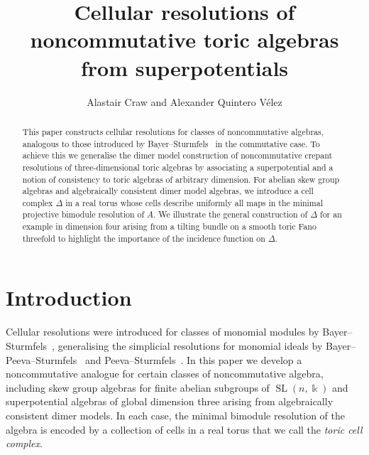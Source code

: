 \documentclass[11pt,a4paper]{amsart}
\title{Cellular resolutions of noncommutative toric algebras from superpotentials}
\author{Alastair Craw and Alexander Quintero V\'{e}lez}
\numberwithin{equation}{section}
\theoremstyle{definition}
\theoremstyle{remark}
\newcommand{\kk}{\ensuremath{\Bbbk}}
\newcommand{\SL}{\operatorname{SL}}
\begin{document}


 \begin{abstract}
  This paper constructs cellular resolutions for classes of noncommutative algebras,  analogous to those introduced by Bayer--Sturmfels~\cite{BayerSturmfels} in the  commutative case. To achieve this we generalise the dimer model construction of noncommutative crepant resolutions of three-dimensional toric algebras by associating a superpotential and a notion of consistency to toric algebras of arbitrary dimension. For abelian skew group algebras and algebraically consistent dimer model algebras, we introduce a cell complex $\Delta$ in a real torus whose cells describe uniformly all maps in the minimal projective bimodule resolution of $A$. We illustrate the general construction of $\Delta$ for an example in dimension four arising from a tilting bundle on a smooth toric Fano threefold to highlight the importance of the incidence function on $\Delta$.
  \end{abstract}

 \maketitle

 \section{Introduction}
 Cellular resolutions were introduced for classes of monomial modules by Bayer--Sturmfels~\cite{BayerSturmfels}, generalising the simplicial resolutions for monomial ideals by Bayer--Peeva--Sturmfels~\cite{BPS} and Peeva--Sturmfels~\cite{PeevaSturmfels}. In this paper we  develop a noncommutative analogue for certain classes of noncommutative algebra, including skew group algebras for finite abelian subgroups of $\SL(n,\kk)$ and superpotential algebras of global dimension three arising from algebraically consistent dimer models. In each case, the minimal bimodule resolution of the algebra is encoded by a collection of cells in a real torus that we call the \emph{toric cell complex}.
\end{document}
